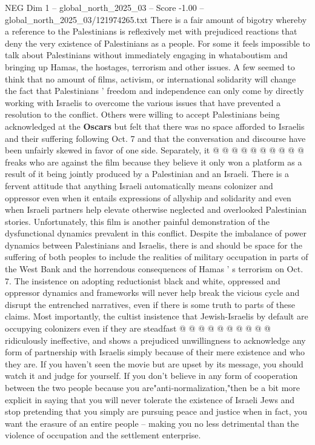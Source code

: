 \begin{textsample}{NEG Dim 1 – global\_north\_2025\_03 – Score -1.00 – global\_north\_2025\_03/121974265.txt}
There is a fair amount of bigotry whereby a reference to the Palestinians is reflexively met with prejudiced reactions that deny the very existence of Palestinians as a people.
For some it feels impossible to talk about Palestinians without immediately engaging in whataboutism and bringing up Hamas, the hostages, terrorism and other issues.
A few seemed to think that no amount of films, activism, or international solidarity will change the fact that Palestinians ' freedom and independence can only come by directly working with Israelis to overcome the various issues that have prevented a resolution to the conflict.
Others were willing to accept Palestinians being acknowledged at the \textbf{Oscars} but felt that there was no space afforded to Israelis and their suffering following Oct. 7 and that the conversation and discourse have been unfairly skewed in favor of one side.
Separately, it @ @ @ @ @ @ @ @ @ @ freaks who are against the film because they believe it only won a platform as a result of it being jointly produced by a Palestinian and an Israeli.
There is a fervent attitude that anything Israeli automatically means colonizer and oppressor even when it entails expressions of allyship and solidarity and even when Israeli partners help elevate otherwise neglected and overlooked Palestinian stories.
Unfortunately, this film is another painful demonstration of the dysfunctional dynamics prevalent in this conflict.
Despite the imbalance of power dynamics between Palestinians and Israelis, there is and should be space for the suffering of both peoples to include the realities of military occupation in parts of the West Bank and the horrendous consequences of Hamas ' s terrorism on Oct. 7.
The insistence on adopting reductionist black and white, oppressed and oppressor dynamics and frameworks will never help break the vicious cycle and disrupt the entrenched narratives, even if there is some truth to parts of these claims.
Most importantly, the cultist insistence that Jewish-Israelis by default are occupying colonizers even if they are steadfast @ @ @ @ @ @ @ @ @ @ ridiculously ineffective, and shows a prejudiced unwillingness to acknowledge any form of partnership with Israelis simply because of their mere existence and who they are.
If you haven't seen the movie but are upset by its message, you should watch it and judge for yourself.
If you don't believe in any form of cooperation between the two people because you are"anti-normalization,"then be a bit more explicit in saying that you will never tolerate the existence of Israeli Jews and stop pretending that you simply are pursuing peace and justice when in fact, you want the erasure of an entire people -- making you no less detrimental than the violence of occupation and the settlement enterprise.

\end{textsample}
